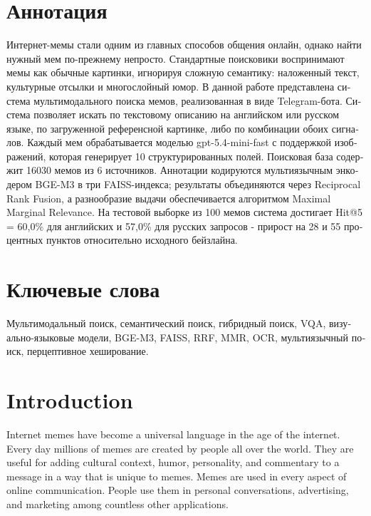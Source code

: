 \documentclass[a4paper,12pt]{article}
\begin{document}
\section*{\foreignlanguage{russian}{Аннотация}}
\foreignlanguage{russian}{
Интернет-мемы стали одним из главных способов общения онлайн, однако найти нужный мем по-прежнему непросто. Стандартные поисковики воспринимают мемы как обычные картинки, игнорируя сложную семантику: наложенный текст, культурные отсылки и многослойный юмор.
В данной работе представлена система мультимодального поиска мемов, реализованная в виде Telegram-бота. Система позволяет искать по текстовому описанию на английском или русском языке, по загруженной референсной картинке, либо по комбинации обоих сигналов. Каждый мем обрабатывается моделью gpt-5.4-mini-fast с поддержкой изображений, которая генерирует 10 структурированных полей. Поисковая база содержит 16030 мемов из 6 источников. Аннотации кодируются мультиязычным энкодером BGE-M3 в три FAISS-индекса; результаты объединяются через Reciprocal Rank Fusion, а разнообразие выдачи обеспечивается алгоритмом Maximal Marginal Relevance.
На тестовой выборке из 100 мемов система достигает Hit@5 = 60,0\% для английских и 57,0\% для русских запросов - прирост на 28 и 55 процентных пунктов относительно исходного бейзлайна.
}

\section*{\foreignlanguage{russian}{Ключевые слова}}
\foreignlanguage{russian}{Мультимодальный поиск, семантический поиск, гибридный поиск, VQA, визуально-языковые модели, BGE-M3, FAISS, RRF, MMR, OCR, мультиязычный поиск, перцептивное хеширование.}

\pagebreak

\section{Introduction}

Internet memes have become a universal language in the age of the internet. Every day millions of memes are created by people all over the world. They are useful for adding cultural context, humor, personality, and commentary to a message in a way that is unique to memes. Memes are used in every aspect of online communication. People use them in personal conversations, advertising, and marketing among countless other applications.
\end{document}
